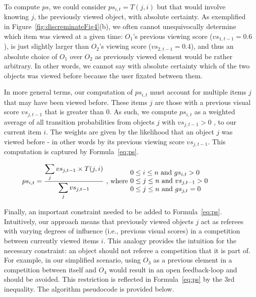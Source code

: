 To compute $ps$, we could consider $ps_{i,t} = T(j,i)$ but that would involve knowing $j$, the previously viewed object, with absolute certainty. As exemplified in Figure~\ref{fig:discreminateFig4}(b), we often cannot unequivocally determine which item was viewed at a given time: $O_1$'s previous viewing score ($vs_{1,t-1}=0.6$), is just slightly larger than $O_2$'s viewing score ($vs_{2,t-1}=0.4$), and thus an absolute choice of $O_1$ over $O_2$ as previously viewed element would be rather arbitrary.  In other words, we cannot say with absolute certainty which of the two objects was viewed before because the user fixated between them. 

In more general terms, our computation of $ps_{i,t}$ must account for multiple items $j$ that may have been viewed before. These items $j$ are those with a previous visual score $vs_{j,t-1}$ that is greater than $0$.  As such, we compute $ps_{i,t}$ as a weighted average of all transition probabilities from objects $j$ with $vs_{j,t-1} > 0$ , to our current item $i$. The weights are given by the likelihood that an object $j$ was viewed before - in other words by its previous viewing score $vs_{j,t-1}$. This computation is captured by Formula~\ref{eq:ps}.  

\begin{equation}
ps_{i,t} = \frac{\displaystyle\sum_{j} {vs_{j,t-1} \times T(j,i)}}{\displaystyle\sum_{j} vs_{j,t-1}} \text{ , where  } \parbox{15em}{$0\leq i \leq n$ and $gs_{i,t} > 0$\\$0\leq j \leq n$ and $vs_{j,t-1} > 0 $\\ $0\leq j \leq n$ and $gs_{j,t} = 0$ }
\label{eq:ps}
\end{equation} 

Finally, an important constraint needed to be added to Formula~\ref{eq:ps}. Intuitively, our approach means that previously viewed objects $j$ act as referees with varying degrees of influence (i.e., previous visual scores) in a competition between currently viewed items $i$. This analogy provides the intuition for the necessary constraint: an object should not referee a competition that it is part of. For example, in our simplified scenario, using $O_3$ as a previous element in a competition between itself and $O_4$ would result in an open feedback-loop and should be avoided. This restriction is reflected in Formula~\ref{eq:ps} by the 3rd inequality.  The algorithm pseudocode is provided below.

